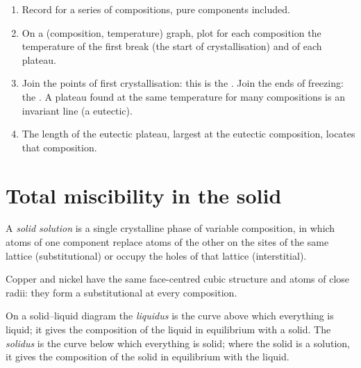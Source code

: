 \begin{method}\label{met:b2:solid-liquid-diagrams:diagram-from-curves}
\begin{enumerate}
  \item Record  for a series of compositions, pure components
        included.
  \item On a (composition, temperature) graph, plot for each composition the
        temperature of the first break (the start of crystallisation) and of
        each plateau.
  \item Join the points of first crystallisation: this is the . Join
        the ends of freezing: the . A plateau found at the same
        temperature for many compositions is an invariant line (a eutectic).
  \item The length of the eutectic plateau, largest at the eutectic
        composition, locates that composition.
\end{enumerate}
\end{method}

\section{Total miscibility in the solid}

\begin{definition}\label{def:b2:solid-liquid-diagrams:solid-solution}
A \emph{solid solution} is a single crystalline phase of
variable composition, in which atoms of one component replace atoms of the
other on the sites of the same lattice (substitutional) or occupy the holes of
that lattice (interstitial).
\end{definition}

Copper and nickel have the same face-centred cubic structure and atoms of close
radii: they form a substitutional  at every composition.

\begin{definition}\label{def:b2:solid-liquid-diagrams:liquidus}
On a solid--liquid diagram the \emph{liquidus} is the curve
above which everything is liquid; it gives the composition of the liquid in
equilibrium with a solid. The \emph{solidus} is the curve below
which everything is solid; where the solid is a solution, it gives the
composition of the solid in equilibrium with the liquid.
\end{definition}

